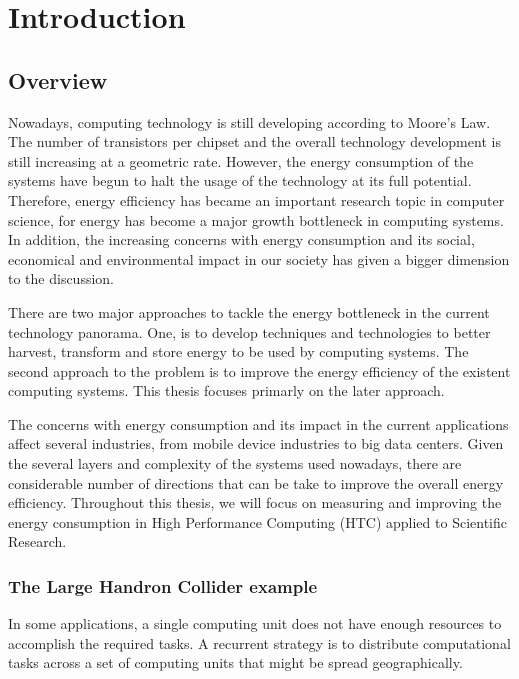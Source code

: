 \chapter{Introduction}

\section{Overview}
Nowadays, computing technology is still developing according to Moore's Law. The number of transistors per
chipset and the overall technology development is still increasing at a geometric rate. However, the energy
consumption of the systems have begun to halt the usage of the technology at its
full potential. Therefore, energy efficiency has became an important
research topic in computer science, for energy has become a major growth
bottleneck in computing systems. In addition, the increasing concerns with energy consumption and
its social, economical and environmental impact in our society has given a
bigger dimension to the discussion.


There are two major approaches to tackle the energy bottleneck in the current
technology panorama. One, is to develop techniques and technologies to better harvest, 
transform and store energy to be used by computing systems. The second approach to the problem is to improve the energy efficiency of the existent computing systems. This thesis focuses primarly on the later approach. 

The concerns with energy consumption and its impact in the current
applications affect several industries, from mobile device industries to big data centers. 
Given the several layers and complexity of the systems used nowadays, there are 
considerable number of directions that can be take to improve the overall energy efficiency. Throughout this thesis, we will focus on measuring and improving the energy
consumption in High Performance Computing (HTC) applied to Scientific Research.


\subsection*{The Large Handron Collider example}
In some applications, a single computing unit does not have enough resources to
accomplish the required tasks. A recurrent strategy is to distribute computational tasks
across a set of computing units that might be spread geographically.

